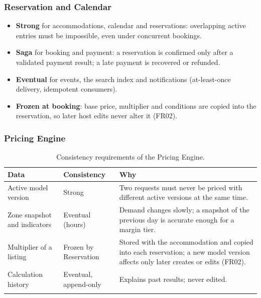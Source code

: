 \subsubsection{Reservation and Calendar}
\begin{itemize}
  \item \textbf{Strong} for accommodations, calendar and reservations: overlapping
    active entries must be impossible, even under concurrent bookings.
  \item \textbf{Saga} for booking and payment: a reservation is confirmed only
    after a validated payment result; a late payment is recovered or refunded.
  \item \textbf{Eventual} for events, the search index and notifications
    (at-least-once delivery, idempotent consumers).
  \item \textbf{Frozen at booking}: base price, multiplier and conditions are
    copied into the reservation, so later host edits never alter it (FR02).
\end{itemize}

\begingroup
\setlength{\emergencystretch}{3em}
\subsubsection{Pricing Engine}
\label{sec:price-consistency}

\begin{longtable}{@{}L{3.4cm}L{3.0cm}L{7.4cm}@{}}
\toprule
\textbf{Data} & \textbf{Consistency} & \textbf{Why} \\
\midrule
\endhead
Active model version & Strong & Two requests must never be priced with
  different active versions at the same time. \\
Zone snapshot and indicators & Eventual (hours) & Demand changes slowly;
  a snapshot of the previous day is accurate enough for a margin tier. \\
Multiplier of a listing & Frozen by Reservation & Stored with the
  accommodation and copied into each reservation; a new model version
  affects only later creates or edits (FR02). \\
Calculation history & Eventual, append-only & Explains past results; never
  edited. \\
\bottomrule
\caption{Consistency requirements of the Pricing Engine.}
\label{tab:price-consistency}
\end{longtable}
\endgroup

